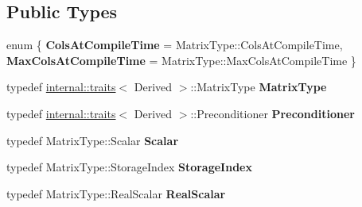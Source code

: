 \subsection*{Public Types}
\begin{DoxyCompactItemize}
\item 
\mbox{\label{class_eigen_1_1_iterative_solver_base_aaa8915f2939578169c1240cba9652a0b}} 
enum \{ {\bfseries Cols\+At\+Compile\+Time} = Matrix\+Type\+::Cols\+At\+Compile\+Time, 
{\bfseries Max\+Cols\+At\+Compile\+Time} = Matrix\+Type\+::Max\+Cols\+At\+Compile\+Time
 \}
\item 
\mbox{\label{class_eigen_1_1_iterative_solver_base_a1df877cce514c709a0333592c25d4465}} 
typedef \mbox{\hyperlink{struct_eigen_1_1internal_1_1traits}{internal\+::traits}}$<$ Derived $>$\+::Matrix\+Type {\bfseries Matrix\+Type}
\item 
\mbox{\label{class_eigen_1_1_iterative_solver_base_a72269c01d2c2a7309ef64724add2bd57}} 
typedef \mbox{\hyperlink{struct_eigen_1_1internal_1_1traits}{internal\+::traits}}$<$ Derived $>$\+::Preconditioner {\bfseries Preconditioner}
\item 
\mbox{\label{class_eigen_1_1_iterative_solver_base_a6394965cb238cfd9dcde422a7d483d49}} 
typedef Matrix\+Type\+::\+Scalar {\bfseries Scalar}
\item 
\mbox{\label{class_eigen_1_1_iterative_solver_base_a9c6e7fa7de26b1608d35c75a5eb6370c}} 
typedef Matrix\+Type\+::\+Storage\+Index {\bfseries Storage\+Index}
\item 
\mbox{\label{class_eigen_1_1_iterative_solver_base_a4d87eef9d6728d2e366c20fd9adf2140}} 
typedef Matrix\+Type\+::\+Real\+Scalar {\bfseries Real\+Scalar}
\end{DoxyCompactItemize}
